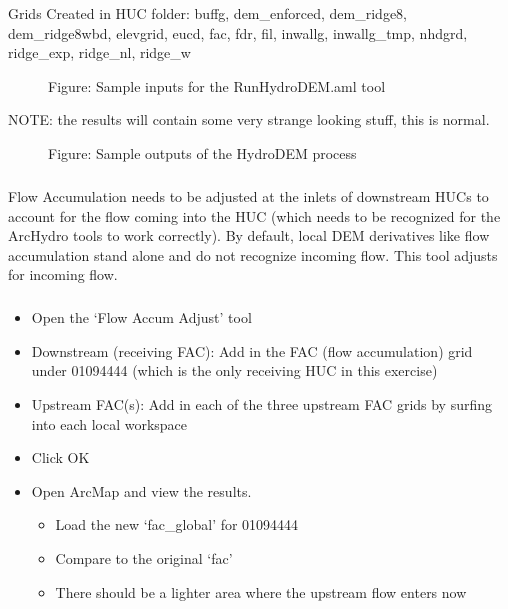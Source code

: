 \documentclass[letterpaper,10pt,english]{sphinxmanual}
\begin{document}
Grids Created in HUC folder: buffg, dem\_enforced, dem\_ridge8, dem\_ridge8wbd, elevgrid, eucd, fac, fdr, fil, inwallg, inwallg\_tmp, nhdgrd, ridge\_exp, ridge\_nl, ridge\_w

\begin{figure}[htbp]
\centering
\capstart

\noindent{}
\caption{Figure: Sample inputs for the RunHydroDEM.aml tool}\label{\detokenize{ex_1:id16}}\end{figure}

NOTE: the results will contain some very strange looking stuff, this is normal.

\begin{figure}[htbp]
\centering
\capstart

\noindent{}
\caption{Figure: Sample outputs of the HydroDEM process}\label{\detokenize{ex_1:id17}}\end{figure}


\subparagraph{}
\label{\detokenize{ex_1:e-flow-accumulation-adjust-need-this-when-joining-globals}}

\subparagraph{}
\label{\detokenize{ex_1:id1}}
Flow Accumulation needs to be adjusted at the inlets of downstream HUCs to account for the flow coming into the HUC (which needs to be recognized for the ArcHydro tools to work correctly). By default, local DEM derivatives like flow accumulation stand alone and do not recognize incoming flow. This tool adjusts for incoming flow.


\subparagraph{}
\label{\detokenize{ex_1:regular-flow-accum-adjust}}
\begin{itemize}
\item {} 
Open the ‘Flow Accum Adjust’ tool

\item {} 
Downstream (receiving FAC):  Add in the FAC (flow accumulation) grid under 01094444 (which is the only receiving HUC in this exercise)

\item {} 
Upstream FAC(s):  Add in each of the three upstream FAC grids by surfing into each local workspace

\item {} 
Click OK

\item {} 
Open ArcMap and view the results.
\begin{itemize}
\item {} 
Load the new ‘fac\_global’ for 01094444

\item {} 
Compare to the original ‘fac’

\item {} 
There should be a lighter area where the upstream flow enters now

\end{itemize}

\end{itemize}
\end{document}
